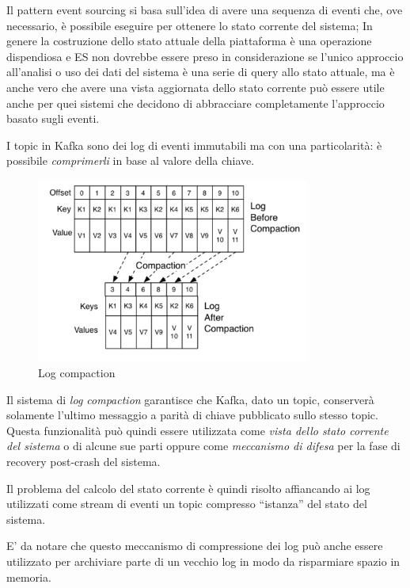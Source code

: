 \documentclass[]{article}
\begin{document}
Il pattern event sourcing si basa sull'idea di avere una sequenza di
eventi che, ove necessario, è possibile eseguire per ottenere lo stato
corrente del sistema; In genere la costruzione dello stato attuale della
piattaforma è una operazione dispendiosa e ES non dovrebbe essere preso
in considerazione se l'unico approccio all'analisi o uso dei dati del
sistema è una serie di query allo stato attuale, ma è anche vero che
avere una vista aggiornata dello stato corrente può essere utile anche
per quei sistemi che decidono di abbracciare completamente l'approccio
basato sugli eventi.

I topic in Kafka sono dei log di eventi immutabili ma con una
particolarità: è possibile \emph{comprimerli} in base al valore della
chiave.

\begin{figure}
\centering
\includegraphics[width=0.80000\textwidth]{../images/log-compaction.png}
\caption{Log compaction \label{figure_5}}
\end{figure}

Il sistema di \emph{log compaction} garantisce che Kafka, dato un topic,
conserverà solamente l'ultimo messaggio a parità di chiave pubblicato
sullo stesso topic. Questa funzionalità può quindi essere utilizzata
come \emph{vista dello stato corrente del sistema} o di alcune sue parti
oppure come \emph{meccanismo di difesa} per la fase di recovery
post-crash del sistema.

Il problema del calcolo del stato corrente è quindi risolto affiancando
ai log utilizzati come stream di eventi un topic compresso ``istanza''
del stato del sistema.

E' da notare che questo meccanismo di compressione dei log può anche
essere utilizzato per archiviare parte di un vecchio log in modo da
risparmiare spazio in memoria.
\end{document}
